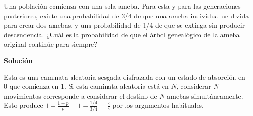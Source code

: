 Una población comienza con una sola ameba. Para esta y para las generaciones
posteriores, existe una probabilidad de 3/4 de que una ameba individual se
divida para crear dos amebas, y una probabilidad de 1/4 de que se extinga sin
producir descendencia. ¿Cuál es la probabilidad de que el árbol genealógico de
la ameba original continúe para siempre?

\textbf{Solución}

Esta es una caminata aleatoria sesgada disfrazada con un estado de absorción en
0 que comienza en 1. Si esta caminata aleatoria está en $N$, considerar $N$
movimientos corresponde a considerar el destino de $N$ amebas simultáneamente.
Esto produce $1-\frac{1-p}{p}=1-\frac{1/4}{3/4}=\frac{2}{3}$ por los argumentos
habituales.

%
%



